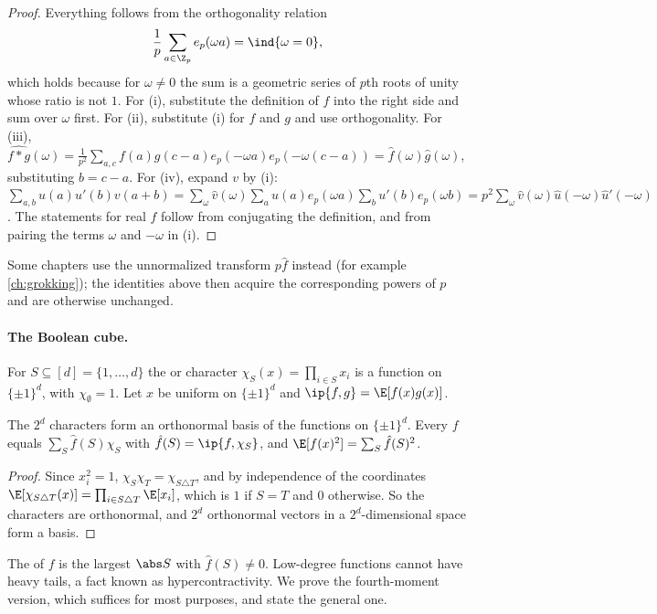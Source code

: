 \begin{refsection}
\begin{proof}
Everything follows from the orthogonality relation
\[
  \frac1p\sum_{a\in\Z_p}e_p(\omega a)=\ind\{\omega=0\},
\]
which holds because for $\omega\ne0$ the sum is a geometric series of $p$th roots of unity whose ratio is not $1$. For (i), substitute the definition of $\hat f$ into the right side and sum over $\omega$ first. For (ii), substitute (i) for $f$ and $g$ and use orthogonality. For (iii), $\widehat{f*g}(\omega)=\frac1{p^2}\sum_{a,c}f(a)g(c-a)e_p(-\omega a)e_p(-\omega(c-a))=\hat f(\omega)\hat g(\omega)$, substituting $b=c-a$. For (iv), expand $v$ by (i): $\sum_{a,b}u(a)u'(b)v(a+b)=\sum_\omega\hat v(\omega)\sum_au(a)e_p(\omega a)\sum_bu'(b)e_p(\omega b)=p^2\sum_\omega\hat v(\omega)\hat u(-\omega)\hat u'(-\omega)$. The statements for real $f$ follow from conjugating the definition, and from pairing the terms $\omega$ and $-\omega$ in (i).
\end{proof}

Some chapters use the unnormalized transform $p\hat f$ instead (for example \cref{ch:grokking}); the identities above then acquire the corresponding powers of $p$ and are otherwise unchanged.

\paragraph{The Boolean cube.} For $S\subseteq[d]=\{1,\dots,d\}$ the  or character $\chi_S(x)=\prod_{i\in S}x_i$ is a function on $\{\pm1\}^d$, with $\chi_\emptyset=1$. Let $x$ be uniform on $\{\pm1\}^d$ and $\ip{f,g}=\E[f(x)g(x)]$.

\begin{theorem}\label{thm:toolkit:fourier-cube}
The $2^d$ characters form an orthonormal basis of the functions on $\{\pm1\}^d$. Every $f$ equals $\sum_S\hat f(S)\chi_S$ with $\hat f(S)=\ip{f,\chi_S}$, and $\E[f(x)^2]=\sum_S\hat f(S)^2$.
\end{theorem}

\begin{proof}
Since $x_i^2=1$, $\chi_S\chi_T=\chi_{S\triangle T}$, and by independence of the coordinates $\E[\chi_{S\triangle T}(x)]=\prod_{i\in S\triangle T}\E[x_i]$, which is $1$ if $S=T$ and $0$ otherwise. So the characters are orthonormal, and $2^d$ orthonormal vectors in a $2^d$-dimensional space form a basis.
\end{proof}

The  of $f$ is the largest $\abs S$ with $\hat f(S)\ne0$. Low-degree functions cannot have heavy tails, a fact known as hypercontractivity. We prove the fourth-moment version, which suffices for most purposes, and state the general one.


\end{refsection}
